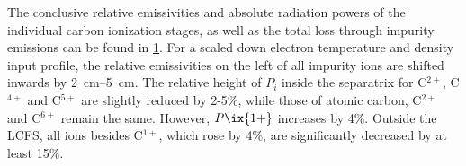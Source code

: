                 \begin{figure}[t]%
                    \centering%
                    \begin{minipage}[b]{0.48\textwidth}%
                        \centering%
                    \end{minipage}%
                    \hfill%
                    \begin{minipage}[b]{0.48\textwidth}%
                        \centering%
                    \end{minipage}%
                    \label{fig:rad_ratios_total_82_90}%
                \end{figure}%
%
                The conclusive relative emissivities and absolute radiation powers of the individual carbon ionization stages, as well as the total loss through impurity emissions can be found in \cref{fig:rad_ratios_total_82_90}. For a scaled down electron temperature and density input profile, the relative emissivities on the left of all impurity ions are shifted inwards by \SIrange{2}{5}{\centi\meter}. The relative height of $P_{i}$ inside the separatrix for C$^{2+}$, C$^{4+}$ and C$^{5+}$ are slightly reduced by 2-5\%, while those of atomic carbon, C$^{2+}$ and C$^{6+}$ remain the same. However, $P\ix{1+}$ increases by 4\%. Outside the LCFS, all ions besides C$^{1+}$, which rose by 4\%, are significantly decreased by at least 15\%.\\%
